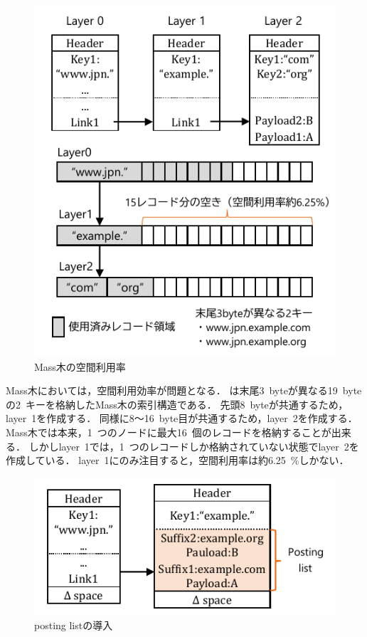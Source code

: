 \begin{figure}[t]
    \centering
    \includegraphics{./figures/mass_memory.pdf}
    \caption{Mass木の空間利用率}
    \label{fig:memory}
\end{figure}

Mass木においては，空間利用効率が問題となる．
\Fig{\ref{fig:memory}}は末尾3~byteが異なる19~byteの2~キーを格納したMass木の索引構造である．
先頭8~byteが共通するため，layer~1を作成する．
同様に8～16~byte目が共通するため，layer~2を作成する．
Mass木では本来，1~つのノードに最大16~個のレコードを格納することが出来る．
しかしlayer~1では，1~つのレコードしか格納されていない状態でlayer~2を作成している．
layer~1にのみ注目すると，空間利用率は約6.25~\%しかない．

\begin{figure}[t]
    \centering
    \includegraphics{./figures/posting_list.pdf}
    \caption{posting listの導入}
    \label{fig:posting_list}
\end{figure}

